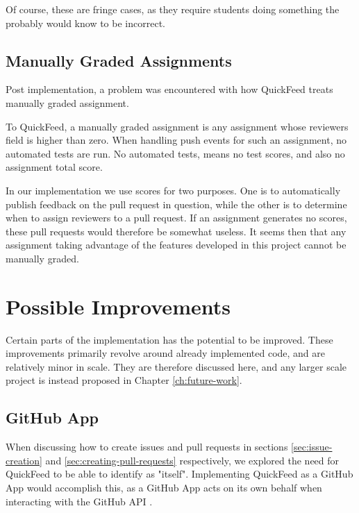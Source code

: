 Of course, these are fringe cases, as they require students doing something the probably would know to be incorrect.

\subsection{Manually Graded Assignments}

Post implementation, a problem was encountered with how QuickFeed treats manually graded assignment.

To QuickFeed, a manually graded assignment is any assignment whose reviewers field is higher than zero.
When handling push events for such an assignment, no automated tests are run.
No automated tests, means no test scores, and also no assignment total score.

In our implementation we use scores for two purposes.
One is to automatically publish feedback on the pull request in question, while the other is to determine when to assign reviewers to a pull request.
If an assignment generates no scores, these pull requests would therefore be somewhat useless.
It seems then that any assignment taking advantage of the features developed in this project cannot be manually graded.

\section{Possible Improvements}

Certain parts of the implementation has the potential to be improved.
These improvements primarily revolve around already implemented code, and are relatively minor in scale.
They are therefore discussed here, and any larger scale project is instead proposed in Chapter \ref{ch:future-work}.

\subsection{GitHub App}
\label{section:github-app}

When discussing how to create issues and pull requests in sections \ref{sec:issue-creation} and \ref{sec:creating-pull-requests} respectively, we explored the need for QuickFeed to be able to identify as "itself".
Implementing QuickFeed as a GitHub App would accomplish this, as a GitHub App acts on its own behalf when interacting with the GitHub API \cite{apps}.

